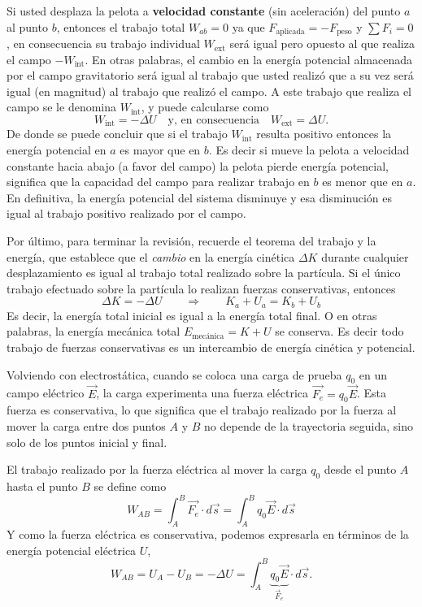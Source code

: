 \begin{tcolorbox}
  Si usted desplaza la pelota a \textbf{velocidad constante} (sin aceleración) del punto \(a\) al punto \(b\), entonces el trabajo total \(W_{ab}=0\) ya que \(F_\text{aplicada}=-F_\text{peso}\) y \(\sum F_i = 0\), en consecuencia su trabajo individual \(W_\text{ext}\) será igual pero opuesto al que realiza el campo \(-W_\text{int}\). En otras palabras, el cambio en la energía potencial almacenada por el campo gravitatorio será igual al trabajo que usted realizó que a su vez será igual (en magnitud) al trabajo que realizó el campo. A este trabajo que realiza el campo se le denomina \(W_\text{int}\), y puede calcularse como
  \[
    W_\text{int}= -\Delta U \quad \text{y, en consecuencia} \quad W_\text{ext}= \Delta U.
  \]
  De donde se puede concluir que si el trabajo \(W_\text{int}\) resulta positivo entonces la energía potencial en \(a\) es mayor que en \(b\). Es decir si mueve la pelota a velocidad constante hacia abajo (a favor del campo) la pelota pierde energía potencial, significa que la capacidad del campo para realizar trabajo en \(b\) es menor que en \(a\). En definitiva, la energía potencial del sistema disminuye y esa disminución es igual al trabajo positivo realizado por el campo.

  Por último, para terminar la revisión, recuerde el teorema del trabajo y la energía, que establece que el \emph{cambio} en la energía cinética \(\Delta K\) durante cualquier desplazamiento es igual al trabajo total realizado sobre la partícula. Si el único trabajo efectuado sobre la partícula lo realizan fuerzas conservativas, entonces 
  \[
    \Delta K = - \Delta U \qquad \Rightarrow \qquad K_a + U_a = K_b + U_b
  \]
  Es decir, la energía total inicial es igual a la energía total final. O en otras palabras, la energía mecánica total \(E_\text{mecánica} = K + U\) se conserva. Es decir todo trabajo de fuerzas conservativas es un intercambio de energía cinética y potencial.
\end{tcolorbox}

Volviendo con electrostática, cuando se coloca una carga de prueba \(q_0\) en un campo eléctrico \(\vec{E}\), la carga experimenta una fuerza eléctrica \(\vec{F_e}=q_0\vec{E}\). Esta fuerza es conservativa, lo que significa que el trabajo realizado por la fuerza al mover la carga entre dos puntos \(A\) y \(B\) no depende de la trayectoria seguida, sino solo de los puntos inicial y final.

El trabajo realizado por la fuerza eléctrica al mover la carga \(q_0\) desde el punto \(A\) hasta el punto \(B\) se define como
\begin{equation*}
  W_{AB} = \int_A^B \vec{F_e} \cdot d\vec{s} = \int_A^B q_0\vec{E} \cdot d\vec{s}
\end{equation*}
Y como la fuerza eléctrica es conservativa, podemos expresarla en términos de la energía potencial eléctrica \(U\),
\begin{equation*}
  W_{AB} = U_A - U_B = -\Delta U = \int_A^B \underbrace{q_0\vec{E}}_{\vec{F}_e} \cdot d\vec{s}.
\end{equation*}

